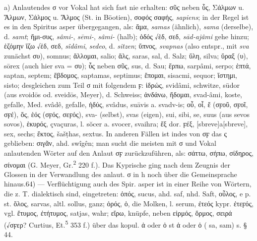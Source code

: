 a) Anlautendes σ vor Vokal hat sich fast nie erhalten: σῦς neben ὗς, Σάλμων u.
Ἄλμων, Σάλμος u. Ἄλμος (St. in Böotien), σοφός σαφής,  \emph{sapiens}; in der Regel
ist es in den Spiritus asper übergegangen, als: ἅμα, 
\emph{samas} (ähnlich), 
\emph{sama} (derselbe), d. \emph{samt}; ἥμι-συς, 
\emph{sâmi-},  \emph{sēmi-},  \emph{sâmi-} (halb); ὁδός
√ἑδ, σεδ,  \emph{sād-ajâmi} gehe hinzu; ἑζόμην ἵζω √ἑδ, σεδ, 
\emph{sîdâmi},  \emph{sedeo}, d. \emph{sitzen}; ὕπνος,
 \emph{svapnas} (also  entspr., mit \emph{sva}
zunächst συ),  somnus; ἅλλομαι,  salio; ἅλς,  saras,  sal, d. Salz;
ὕλη,  silva; ὕραξ (υ),  sōrex (auch hier sva = συ); ὗς neben σῦς,  sus,
d. Sau; ἕρπω,  sarpâmi,  serpo; ἑπτά,  saptan,  septem; ἕβδομος, 
saptamas,  septimus; ἕπομαι,  sisacmi,  sequor; ἵστημι,  sisto;
desgleichen zum Teil σ mit folgendem ϝ: ἱδρώς,  svidâmi, schwitze,  sūdor
(aus svoidōs od. sveidōs,  Meyer), d. Schweiss; ἁνδάνω, ἥδομαι,  svad-âmi,
koste, gefalle, Med. svâdê, gefalle, ἡδύς,  svâdus,  suāvis a. svadv-is;
οὗ, οἷ, ἕ (σϝοῦ, σϝοῖ, σϝέ), ὅς, ἑός (σϝός, σεϝός),  sva- (selbst), svas
(eigen),  sui, sibi, se, suus (aus sevos sovos), ἑκυρός,  çvaçuras, l.
sŏcer a. svocer,  svaihra; ἕξ dor. ϝέξ,  [sbreve]a[sbreve], sex, sechs;
ἕκτος,  šašṭhas,  sextus. In anderen Fällen ist indes von σϝ das ς
geblieben: σιγᾶν, ahd. swîgên; man sucht die meisten mit σ und Vokal anlautenden
Wörter auf den Anlaut σϝ zurückzuführen, als: σάττω, σήπω, σίδηρος, σίνομαι (G.
Meyer, Gr.\textsuperscript{2} 220 f.). Das Kyprische ging nach dem Zeugnis der
Glossen in der Verwandlung des anlaut. σ in h noch über die Gemeinsprache
hinaus.64) — Verflüchtigung auch des Spir. asper ist in einer Reihe von Wörtern,
die z. T. dialektisch sind, eingetreten: ὀπός, sucus, ahd. saf, nhd. Saft,
οὖλος, e p. st. ὅλος,  sarvas, altl. sollus, ganz; ὀρός, ὁ, die Molken, l.
serum, ἐτεός kypr. ἐτεϝός, vgl. ἔτυμος, ἐτήτυμος,  satjas, wahr; εἴρω,
knüpfe, neben εἱρμός, ὅρμος, σειρά (√σϝερ? Curtius,
Et.\textsuperscript{5} 353 f.) über das kopul. ἀ oder ὀ st ἁ oder ὁ ( sa,
sam) s. § 44. 

